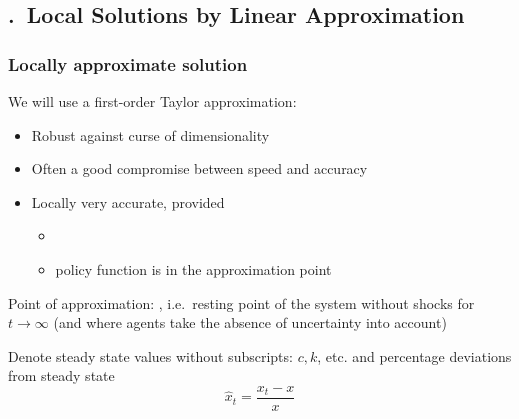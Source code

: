 \documentclass[handout,usepdftitle=false,xcolor=dvipsnames,aspectratio=169]{beamer}
\begin{document}
\renewcommand{\Source}{}
\subsection{\thesection.\thesubsection \ Local Solutions by Linear Approximation}

\begin{frame}
\frametitle{Locally approximate solution}
\begin{witemize}
\item We will use a first-order Taylor approximation:
\begin{itemize}
\item Robust against curse of dimensionality
\item Often a good compromise between speed and accuracy
\item Locally very accurate, provided
    \begin{itemize}
    \item {}
    \item policy function is  in the approximation point
    \end{itemize}
\end{itemize}
\item Point of approximation: , i.e.\ resting point of the system without shocks for $t \rightarrow \infty$ (and where agents take the absence of uncertainty into account)
\item Denote steady state values without subscripts: $c,k$, etc. and percentage deviations from steady state
\begin{equation}
    \hat{x}_t=\frac{x_t-x}{x}
\end{equation}
\end{witemize}
\end{frame}
\end{document}

